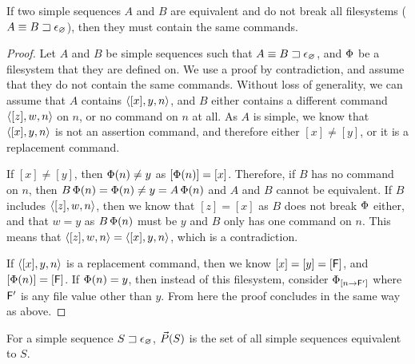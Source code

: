 \begin{mylem}
If two simple sequences $A$ and $B$ are equivalent
and do not break all filesystems ($A\equiv {B}\sqsupset\epsilon_\varnothing$),
then they must contain the same commands.
\end{mylem}
\begin{proof}
Let $A$ and $B$ be simple sequences
such that $A\equiv {B}\sqsupset\epsilon_\varnothing$,
and $\Phi$ be a filesystem that they are defined on.
We use a proof by contradiction, and assume that they do not contain the same commands.
Without loss of generality, we can assume
that $A$
contains $\langle{[x],y,n}\rangle$, and $B$ either contains a different command
$\langle{[z],w,n}\rangle$ on $n$, or no command on $n$ at all.
As $A$ is simple, we know that $\langle{[x],y,n}\rangle$ is not an assertion command,
and therefore either $[x]\neq [y]$, or it is a replacement command.

If $[x]\neq [y]$, then $\Phi(n)\neq y$ as $[\Phi(n)]=[x]$.
Therefore, if $B$ has no command on $n$, then $B\,\Phi(n)=\Phi(n)\neq y=A\,\Phi(n)$ and
$A$ and $B$ cannot be equivalent.
If $B$ includes $\langle{[z],w,n}\rangle$, then we know that $[z]=[x]$ as $B$ does not break $\Phi$ either,
and that $w=y$ as $B\,\Phi(n)$ must
be $y$ and $B$ only has one command on $n$.
This means that $\langle{[z],w,n}\rangle=\langle{[x],y,n}\rangle$, which is a contradiction.

If $\langle{[x],y,n}\rangle$ is a replacement command, then we know $[x]=[y]=[\mathsf{F}]$, and
$[\Phi(n)]=[\mathsf{F}]$. If $\Phi(n)=y$, then instead of this filesystem,
consider ${\Phi}_{[{n}\rightarrow{\mathsf{F}'}]}$ where $\mathsf{F}'$ is any file value
other than $y$.
From here the proof concludes in the same way as above.
\end{proof}


\begin{mylem}
For a simple sequence ${S}\sqsupset\epsilon_\varnothing$,
$\vec{P}({S})$ is the set of all simple sequences equivalent to $S$.
\end{mylem}

